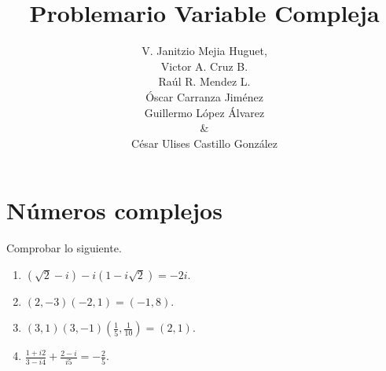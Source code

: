 \documentclass[twoside]{book}
\title{Problemario Variable Compleja}
\author{V. Janitzio Mejia Huguet,\\ Victor A. Cruz B. \\Ra\'ul R. Mendez L.\\ \'Oscar Carranza Jim\'enez\\ Guillermo L\'opez \'Alvarez\\ \& \\C\'esar Ulises Castillo Gonz\'alez}
\begin{document}
\chapter{Números complejos}

\begin{example}{}
    Comprobar lo siguiente.
    \begin{multicols}{2}
        \begin{enumerate}[label=\alph*).]
            \item $(\sqrt{2}-i)-i(1-i\sqrt{2})=-2i$.
            \item $(2,-3)(-2,1)=(-1,8)$.
            \item $\displaystyle(3,1)(3,-1)\left(\frac{1}{5},\frac{1}{10}\right)=(2,1)$.
            \item $\displaystyle \frac{1+i2}{3-i4}+\frac{2-i}{i5}=-\frac{2}{5}$.
        \end{enumerate}
    \end{multicols}
\end{example}
\end{document}
